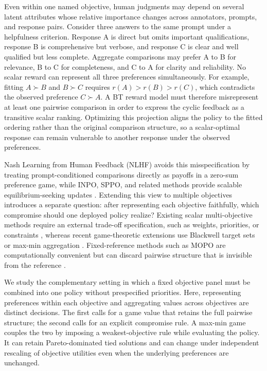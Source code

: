 \documentclass{article}
\theoremstyle{remark}
\theoremstyle{plain}
\begin{document}
Even within one named objective, human judgments may depend on several latent attributes whose relative importance changes across annotators, prompts, and response pairs. Consider three answers to the same prompt under a helpfulness criterion. Response A is direct but omits important qualifications, response B is comprehensive but verbose, and response C is clear and well qualified but less complete. Aggregate comparisons may prefer A to B for relevance, B to C for completeness, and C to A for clarity and reliability. No scalar reward can represent all three preferences simultaneously. For example, fitting $A\succ B$ and $B\succ C$ requires $r(A)>r(B)>r(C)$, which contradicts the observed preference $C\succ A$. A BT reward model must therefore misrepresent at least one pairwise comparison in order to express the cyclic feedback as a transitive scalar ranking. Optimizing this projection aligns the policy to the fitted ordering rather than the original comparison structure, so a scalar-optimal response can remain vulnerable to another response under the observed preferences.

Nash Learning from Human Feedback (NLHF) avoids this misspecification by treating prompt-conditioned comparisons directly as payoffs in a zero-sum preference game, while INPO, SPPO, and related methods provide scalable equilibrium-seeking updates \citep{munos2024nash,zhang2025iterative,wu2025sppo,calandriello2024online,rosset2024direct,zhou2025egpo}. Extending this view to multiple objectives introduces a separate question: after representing each objective faithfully, which compromise should one deployed policy realize? Existing scalar multi-objective methods require an external trade-off specification, such as weights, priorities, or constraints \citep{zhou2024beyond,rame2023rewarded,zhong2024panacea,chakraborty2024maxmin,son2026rmod,agnihotri2026mopo}, whereas recent game-theoretic extensions use Blackwell target sets or max-min aggregation \citep{blackwell1956analog,bhatia2020multicriteria,zhang2026prosper}. Fixed-reference methods such as MOPO are computationally convenient but can discard pairwise structure that is invisible from the reference \citep{agnihotri2026mopo,zhang2026prosper}.

We study the complementary setting in which a fixed objective panel must be combined into one policy without prespecified priorities. Here, representing preferences within each objective and aggregating values across objectives are distinct decisions. The first calls for a game value that retains the full pairwise structure; the second calls for an explicit compromise rule. A max-min game couples the two by imposing a weakest-objective rule while evaluating the policy. It can retain Pareto-dominated tied solutions and can change under independent rescaling of objective utilities even when the underlying preferences are unchanged.
\end{document}
